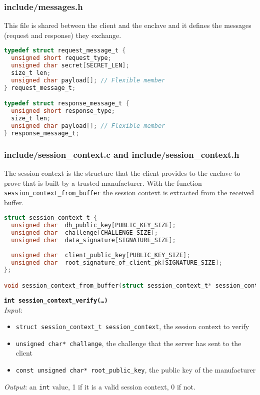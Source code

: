 \subsubsection{include/messages.h}
This file is shared between the client and the enclave and it defines the messages (request and response) they exchange. \\
\begin{lstlisting}[language=C,frame=single]
typedef struct request_message_t {
  unsigned short request_type;
  unsigned char secret[SECRET_LEN];
  size_t len;
  unsigned char payload[]; // Flexible member
} request_message_t;

typedef struct response_message_t {
  unsigned short response_type;
  size_t len;
  unsigned char payload[]; // Flexible member
} response_message_t;
\end{lstlisting}
\newpage
\subsubsection{include/session\_context.c and include/session\_context.h}
The session context is the structure that the client provides to the enclave to prove that is built by a trusted manufacturer. With the function \texttt{session\_context\_from\_buffer} the session context is extracted from the received buffer. \\
\begin{lstlisting}[language=C,frame=single]
struct session_context_t {
  unsigned char  dh_public_key[PUBLIC_KEY_SIZE];
  unsigned char  challenge[CHALLENGE_SIZE];
  unsigned char  data_signature[SIGNATURE_SIZE];
  
  unsigned char  client_public_key[PUBLIC_KEY_SIZE];
  unsigned char  root_signature_of_client_pk[SIGNATURE_SIZE];
};

void session_context_from_buffer(struct session_context_t* session_context, unsigned char* buffer);
\end{lstlisting}

\noindent
\texttt{\bfseries int session\_context\_verify(\dots)}\\
\textit{Input}:
\begin{itemize}[noitemsep,nolistsep]
  \item \texttt{struct session\_context\_t session\_context}, the session context to verify
  \item \texttt{unsigned char* challange}, the challenge that the server has sent to the client
  \item \texttt{const unsigned char* root\_public\_key}, the public key of the manufacturer
\end{itemize}
\textit{Output}: an \texttt{int} value, 1 if it is a valid session context, 0 if not.


